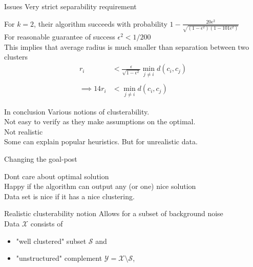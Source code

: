 \documentclass{beamer}
\newcommand{\mc}{\mathcal}
\begin{document}
\begin{frame}{Issues}
	\alert{Very strict} separability requirement
	
	\vspace{0.5cm}For $k = 2$, their algorithm succeeds with probability $1 - \frac{20\epsilon^2}{\sqrt{(1-\epsilon^2)(1-101\epsilon^2)}}$ \\

	\vspace{0.5cm}For reasonable guarantee of success $\epsilon^2 < 1/200$\\
	
	\vspace{1cm}This implies that \alert{average radius} is much smaller than separation between two clusters 
	\begin{align*}
		r_i &< \frac{\epsilon}{\sqrt{1-\epsilon^2}} \min_{j \neq i} d(c_i, c_j)\\\\
		\implies 14 r_i &< \min_{j \neq i} d(c_i, c_j) 
	\end{align*}
\end{frame}

\begin{frame}{In conclusion}
Various notions of clusterability.\\
\vspace{1cm}Not easy to verify as they make assumptions on the optimal. \\
\vspace{1cm}Not {\color{blue}realistic}\\
\vspace{1cm}Some can explain popular heuristics. But for unrealistic data. \\

\end{frame}

\begin{frame}{Changing the goal-post}

	Dont care about optimal solution\\
	\vspace{1cm}Happy if the algorithm can output \alert{any (or one) nice} solution\\
	\vspace{1cm}Data set is \alert{nice} if it has a \alert{nice} clustering. 
\end{frame}

\begin{frame}{Realistic clusterability notion}
	Allows for a subset of \alert{background noise}\\
	
	\vspace{1.2cm}Data $\mc X$ consists of 
	\begin{itemize}
	\vspace{0.5cm}
	\item "well clustered" subset $\mc S$ and 
	\vspace{0.5cm}
	\item "unstructured" complement $\mc Y= \mc X \setminus \mc S$,
	\end{itemize}
\end{frame}
\end{document}
